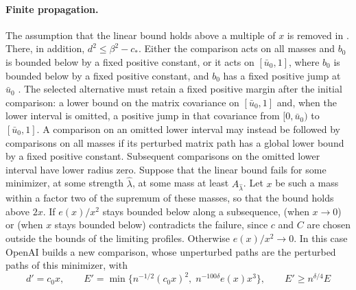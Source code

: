 \paragraph{Finite propagation.} The assumption that the linear bound holds above a multiple of $x$ is removed in \cite[Section~6]{oai-fluctuations}. There, in addition, $d^2\le\beta^2-c_*$. Either the comparison acts on all masses and $b_0$ is bounded below by a fixed positive constant, or it acts on $[{\bar u}_0,1]$, where $b_0$ is bounded below by a fixed positive constant, and $b_0$ has a fixed positive jump at ${\bar u}_0$ \cite[Definition~6.1]{oai-fluctuations}. The selected alternative must retain a fixed positive margin after the initial comparison: a lower bound on the matrix covariance on $[{\bar u}_0,1]$ and, when the lower interval is omitted, a positive jump in that covariance from $[0,{\bar u}_0)$ to $[{\bar u}_0,1]$. A comparison on an omitted lower interval may instead be followed by comparisons on all masses if its perturbed matrix path has a global lower bound by a fixed positive constant. Subsequent comparisons on the omitted lower interval have lower radius zero. Suppose that the linear bound fails for some minimizer, at some strength ${\widehat\lambda}$, at some mass at least $A_{\widehat\lambda}$. Let $x$ be such a mass within a factor two of the supremum of these masses, so that the bound holds above $2x$. If $e(x)/x^2$ stays bounded below along a subsequence, \cite[Theorem~5.1]{oai-fluctuations} (when $x\to0$) or \cite[Proposition~5.9]{oai-fluctuations} (when $x$ stays bounded below) contradicts the failure, since $c$ and $C$ are chosen outside the bounds of the limiting profiles. Otherwise $e(x)/x^2\to0$. In this case OpenAI builds a new comparison, whose unperturbed paths are the perturbed paths of this minimizer, with
\[
 d'=c_0x,\qquad E'=\min\bigl\{n^{-1/2}(c_0x)^2,\;n^{-100\delta}e(x)x^3\bigr\},\qquad E'\ge n^{\delta/4}E
\]
